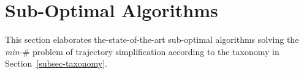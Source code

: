 \newtheorem{theorem}{Theorem}
\newtheorem{lemma}{Lemma}

\section{Sub-Optimal Algorithms}
\label{sec-subopt}



This section elaborates the-state-of-the-art sub-optimal algorithms solving the \emph{min-$\#$} problem of trajectory simplification according to the taxonomy in Section~\ref{subsec-taxonomy}.









